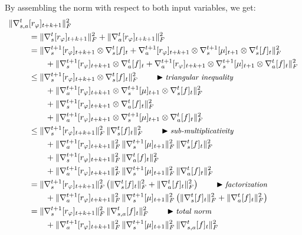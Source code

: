 By assembling the norm with respect to both input variables, we get:
\begin{align}
\lVert \nabla_{s,a}^t&[r_\varphi]_{t+k+1} \rVert ^2_F \nonumber \\
&= \lVert \nabla_s^t[r_\varphi]_{t+k+1} \rVert ^2_F
+ \lVert \nabla_a^t[r_\varphi]_{t+k+1} \rVert ^2_F \\
&=
\lVert
\nabla_s^{t+1}[r_\varphi]_{t+k+1} \otimes \nabla_s^t[f]_t
+ \nabla_a^{t+1}[r_\varphi]_{t+k+1} \otimes \nabla_s^{t+1}[\mu]_{t+1} \otimes \nabla_s^t[f]_t
\rVert ^2_F \\
&\qquad +
\lVert
\nabla_s^{t+1}[r_\varphi]_{t+k+1} \otimes \nabla_a^t[f]_t
+ \nabla_a^{t+1}[r_\varphi]_{t+k+1} \otimes \nabla_s^{t+1}[\mu]_{t+1} \otimes \nabla_a^t[f]_t
\rVert ^2_F \nonumber \\
&\leq
\lVert
\nabla_s^{t+1}[r_\varphi]_{t+k+1} \otimes \nabla_s^t[f]_t
\rVert ^2_F
\qquad
\blacktriangleright\text{\small{\textit{triangular inequality}}} \\
&\qquad +
\lVert
\nabla_a^{t+1}[r_\varphi]_{t+k+1} \otimes \nabla_s^{t+1}[\mu]_{t+1} \otimes \nabla_s^t[f]_t
\rVert ^2_F \nonumber \\
&\qquad +
\lVert
\nabla_s^{t+1}[r_\varphi]_{t+k+1} \otimes \nabla_a^t[f]_t
\rVert ^2_F \nonumber \\
&\qquad +
\lVert
\nabla_a^{t+1}[r_\varphi]_{t+k+1} \otimes \nabla_s^{t+1}[\mu]_{t+1} \otimes \nabla_a^t[f]_t
\rVert ^2_F \nonumber \\
&\leq
\lVert\nabla_s^{t+1}[r_\varphi]_{t+k+1}\rVert ^2_F
\,
\lVert\nabla_s^t[f]_t\rVert ^2_F
\qquad
\blacktriangleright\text{\small{\textit{sub-multiplicativity}}} \\
&\qquad +
\lVert\nabla_a^{t+1}[r_\varphi]_{t+k+1}\rVert ^2_F
\,
\lVert\nabla_s^{t+1}[\mu]_{t+1}\rVert ^2_F
\,
\lVert\nabla_s^t[f]_t\rVert ^2_F \nonumber \\
&\qquad +
\lVert\nabla_s^{t+1}[r_\varphi]_{t+k+1}\rVert ^2_F
\,
\lVert\nabla_a^t[f]_t\rVert ^2_F \nonumber \\
&\qquad +
\lVert\nabla_a^{t+1}[r_\varphi]_{t+k+1}\rVert ^2_F
\,
\lVert\nabla_s^{t+1}[\mu]_{t+1}\rVert ^2_F
\,
\lVert\nabla_a^t[f]_t\rVert ^2_F \nonumber \\
&=
\lVert\nabla_s^{t+1}[r_\varphi]_{t+k+1}\rVert ^2_F
\,
\big(
\lVert\nabla_s^t[f]_t\rVert ^2_F +
\lVert\nabla_a^t[f]_t\rVert ^2_F
\big)
\qquad
\blacktriangleright\text{\small{\textit{factorization}}} \\
&\qquad +
\lVert\nabla_a^{t+1}[r_\varphi]_{t+k+1}\rVert ^2_F
\,
\lVert\nabla_s^{t+1}[\mu]_{t+1}\rVert ^2_F
\,
\big(
\lVert\nabla_s^t[f]_t\rVert ^2_F +
\lVert\nabla_a^t[f]_t\rVert ^2_F
\big) \nonumber \\
&=
\lVert\nabla_s^{t+1}[r_\varphi]_{t+k+1}\rVert ^2_F
\,
\lVert\nabla_{s,a}^t[f]_t\rVert ^2_F
\qquad
\blacktriangleright\text{\small{\textit{total norm}}} \\
&\qquad +
\lVert\nabla_a^{t+1}[r_\varphi]_{t+k+1}\rVert ^2_F
\,
\lVert\nabla_s^{t+1}[\mu]_{t+1}\rVert ^2_F
\,
\lVert\nabla_{s,a}^t[f]_t\rVert ^2_F \nonumber
\end{align}

